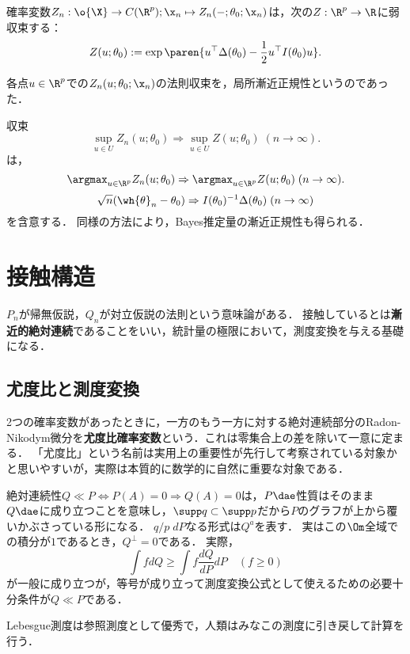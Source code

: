 \documentclass[uplatex,dvipdfmx]{jsreport}
\begin{document}
\begin{theorem}
    確率変数$Z_n:\o{\X}\to C(\R^p);\x_n\mapsto Z_n(-;\theta_0;\x_n)$は，次の$Z:\R^p\to\R$に弱収束する：
    \[Z(u;\theta_0):=\exp\paren{u^\top\Delta(\theta_0)-\frac{1}{2}u^\top I(\theta_0)u}.\]
\end{theorem}
\begin{remarks}[局所漸近正規性再考]
    各点$u\in\R^p$での$Z_n(u;\theta_0;\x_n)$の法則収束を，局所漸近正規性というのであった．
\end{remarks}

\begin{remarks}[最尤推定量再考]
    収束
    \[\sup_{u\in U}Z_n(u;\theta_0)\Rightarrow\sup_{u\in U}Z(u;\theta_0)\;(n\to\infty).\]
    は，
    \[\argmax_{u\in\R^p}Z_n(u;\theta_0)\Rightarrow\argmax_{u\in\R^p}Z(u;\theta_0)\;(n\to\infty).\]
    \[\sqrt{n}(\wh{\theta}_n-\theta_0)\Rightarrow I(\theta_0)^{-1}\Delta(\theta_0)\;(n\to\infty)\]
    を含意する．
    同様の方法により，Bayes推定量の漸近正規性も得られる．
\end{remarks}

\section{接触構造}

\begin{tcolorbox}[colframe=ForestGreen, colback=ForestGreen!10!white,breakable,colbacktitle=ForestGreen!40!white,coltitle=black,fonttitle=\bfseries\sffamily,
title=]
    $P_n$が帰無仮説，$Q_n$が対立仮説の法則という意味論がある．
    接触しているとは\textbf{漸近的絶対連続}であることをいい，統計量の極限において，測度変換を与える基礎になる．
\end{tcolorbox}

\subsection{尤度比と測度変換}

\begin{tcolorbox}[colframe=ForestGreen, colback=ForestGreen!10!white,breakable,colbacktitle=ForestGreen!40!white,coltitle=black,fonttitle=\bfseries\sffamily,
title=測度変換の公式が成り立つためには，絶対連続性が必要である．]
    2つの確率変数があったときに，一方のもう一方に対する絶対連続部分のRadon-Nikodym微分を\textbf{尤度比確率変数}という．これは零集合上の差を除いて一意に定まる．
    「尤度比」という名前は実用上の重要性が先行して考察されている対象かと思いやすいが，実際は本質的に数学的に自然に重要な対象である．

    絶対連続性$Q\ll P\Leftrightarrow P(A)=0\Rightarrow Q(A)=0$は，$P\dae$性質はそのまま$Q\dae$に成り立つことを意味し，$\supp q\subset\supp p$だから$P$のグラフが上から覆いかぶさっている形になる．
    $q/p\; dP$なる形式は$Q^a$を表す．
    実はこの$\Om$全域での積分が$1$であるとき，$Q^\perp=0$である．
    実際，
    \[\int fdQ\ge\int f\frac{dQ}{dP}dP\quad(f\ge0)\]
    が一般に成り立つが，等号が成り立って測度変換公式として使えるための必要十分条件が$Q\ll P$である．

    Lebesgue測度は参照測度として優秀で，人類はみなこの測度に引き戻して計算を行う．
\end{tcolorbox}
\end{document}
